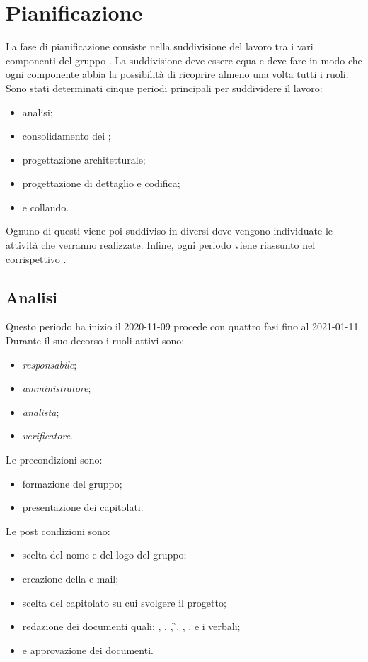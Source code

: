 \section{Pianificazione}
La fase di pianificazione consiste nella suddivisione del lavoro tra i vari componenti del gruppo \Gruppo . La suddivisione deve essere equa e deve fare in modo che ogni componente abbia la possibilità di ricoprire almeno una volta tutti i ruoli. Sono stati determinati cinque periodi principali per suddividere il lavoro:
\begin{itemize}
\item analisi;
\item consolidamento dei ;
\item progettazione architetturale;
\item progettazione di dettaglio e codifica;
\item {} e collaudo.
\end{itemize}
Ognuno di questi viene poi suddiviso in diversi  dove vengono individuate le attività che verranno realizzate.
Infine, ogni periodo viene riassunto nel corrispettivo .
\subsection{Analisi}
Questo periodo ha inizio il 2020-11-09 procede con quattro fasi fino al 2021-01-11.
Durante il suo decorso i ruoli attivi sono:
\begin{itemize}
\item \textit{responsabile};
\item \textit{amministratore};
\item \textit{analista};
\item \textit{verificatore}.
\end{itemize}
Le precondizioni sono:
\begin{itemize}
	\item formazione del gruppo;
	\item presentazione dei capitolati.
\end{itemize}
Le post condizioni sono:
\begin{itemize}
	\item scelta del nome e del logo del gruppo;
	\item creazione della e-mail;
	\item scelta del capitolato su cui svolgere il progetto;
	\item redazione dei documenti quali: \SdF{}, \NdP{}, \PdP{}, \G{}, \LdP{}, \PdQ{}, \AdR{} e i verbali;
	\item {} e approvazione dei documenti.
\end{itemize}

